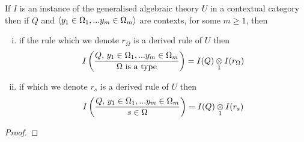 \begin{lemma}
If $I$ is an instance of the generalised algebraic theory $U$ in a contextual category \catcw then
if  $Q$ and $\encyOmega{m}$ are contexts, for some $m \geq 1$,  then
\begin{enumerate}[(i)]
\item if the rule \ZOmega which we denote $r_\Omega$ is a derived rule of $U$ then
$$\displaystyle\Imappedrule{Q,\, \yOmega{m}}{\isT{\Omega}}=\crossx{I(Q)}{I(r_\Omega)}{1}$$
\item if \ZsOmega which we denote $r_s$ is a derived rule of $U$ then 
$$\displaystyle\Imappedrule{Q,\, \yOmega{m}}{\ofT{s}{\Omega}}=\crossx{I(Q)}{I(r_s)}{1}$$
\end{enumerate}
\end{lemma}
\begin{proof}
\end{proof}